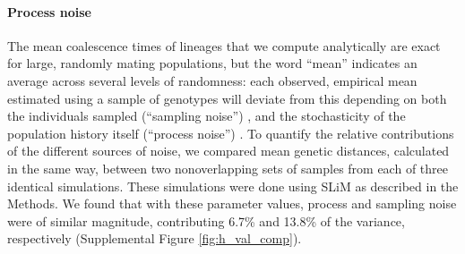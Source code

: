 \documentclass{article}
\begin{document}
\paragraph{Process noise}
The mean coalescence times of lineages that we compute analytically
are exact for large, randomly mating populations,
but the word ``mean'' indicates an average across several levels of randomness:
each observed, empirical mean estimated using a sample of genotypes
will deviate from this depending on both the individuals sampled (``sampling noise'')
\citep{ashander2018demographic},
and the stochasticity of the population history itself (``process noise'')
\citep{wakeley2012genealogies,waples2009modelling}.
To quantify the relative contributions of the different sources of noise,
we compared mean genetic distances, calculated in the same way,
between two nonoverlapping sets of samples from each of three identical simulations.
These simulations were done using SLiM as described in the Methods.
We found that with these parameter values, process and sampling noise were of similar magnitude,
contributing 6.7\% and 13.8\% of the variance, respectively
(Supplemental Figure \ref{fig:h_val_comp}).
\end{document}
